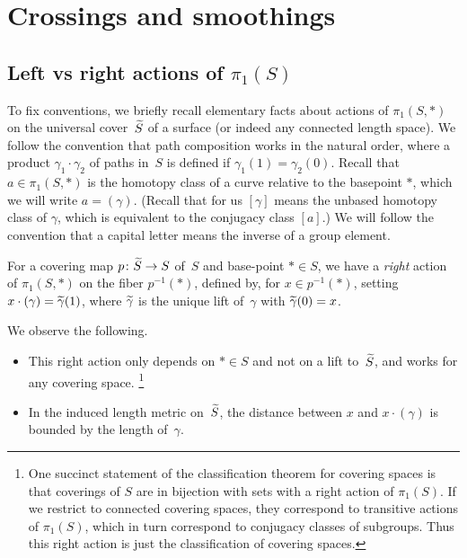 \section{Crossings and smoothings}
\label{sec:smoothing}



\subsection{Left vs right actions of \texorpdfstring{$\pi_1(S)$}{π1(S)}}
\label{sec:actions}

To fix conventions, we briefly recall elementary facts about actions of $\pi_1(S,\ast)$ on the universal cover~$\widetilde{S}$ of a surface (or indeed any connected length space). We
follow the convention that path composition works in the natural
order, where a product $\gamma_1 \cdot \gamma_2$ of paths in~$S$ is
defined if $\gamma_1(1) = \gamma_2(0)$.
Recall that $a \in \pi_1(S,\ast)$ is the homotopy class of a
curve relative to the basepoint $*$, which we will write $a =
(\gamma)$.
(Recall that for us $[\gamma]$ means the unbased homotopy class of
$\gamma$, which is equivalent to the conjugacy class $[a]$.)
 We will follow the
 convention that a capital letter means the inverse of a
 group element.


\begin{definition}
For a covering map $p \colon \widetilde{S} \to S$ of~$S$ and base-point
$\ast \in S$, we have a \emph{right} action of $\pi_1(S,\ast)$ on
the fiber $p^{-1}(\ast)$, defined by, for $x \in p^{-1}(\ast)$, setting
$x\cdot (\gamma) = \widetilde{\gamma}(1)$, where $\widetilde{\gamma}$ is the
unique lift of~$\gamma$ with $\widetilde{\gamma}(0) = x$.
\end{definition}
We observe
the following.
\begin{itemize}
\item 
  This right action only depends on $\ast \in S$ and not on a lift
  to~$\widetilde{S}$, and works for any covering space.%
  \footnote{One succinct statement of the classification theorem for
    covering spaces is that coverings of $S$ are in bijection with
    sets with a right action of $\pi_1(S)$. If we restrict to
    connected covering spaces, they
    correspond to transitive actions of $\pi_1(S)$, which
    in turn correspond to conjugacy classes of subgroups. Thus this
    right action is just the classification of covering spaces.}
\item In the induced length metric on~$\widetilde{S}$, the distance between
  $x$ and $x\cdot (\gamma)$ is bounded by the length of~$\gamma$.
\end{itemize}

